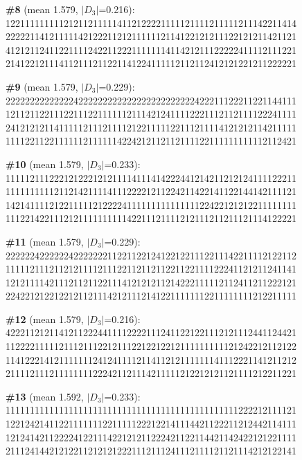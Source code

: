\documentclass[10pt]{article}
\begin{document}
\noindent\textbf{\#8} (mean 1.579, $|D_3|$=0.216):\\
122111111111212112111114112122221111121111211111211142211414\\
222221141211111421222112121111112114122121211122121211421121\\
412121124112211112422112221111111411421211122222411112111221\\
214122121114112111211221141224111112112112412121221211222221\medskip

\noindent\textbf{\#9} (mean 1.579, $|D_3|$=0.229):\\
222222222222224222222222222222222222222422211122211221144111\\
121121122111221112211111121114212411112221112112111122241111\\
241212121141111121112111121221111122111211114121212114211111\\
111122112211111121111114224212112112111122111111111112112421\medskip

\noindent\textbf{\#10} (mean 1.579, $|D_3|$=0.233):\\
111112111222121222121211114111414222441214211212124111122211\\
111111111121121421111411122221211224211422141122144142111121\\
142141111212211111212222411111111111111122422121212211111111\\
111221422111212111111111142211121111212111211211121114122221\medskip

\noindent\textbf{\#11} (mean 1.579, $|D_3|$=0.229):\\
222222422222242222222112211221241221221112211142211112122112\\
111112111211212111121112211211211221122111122241121211241141\\
121211114211121121122111412121211214222111112112411211222121\\
224221212212212112111421211121412211111112211111111212211111\medskip

\noindent\textbf{\#12} (mean 1.579, $|D_3|$=0.216):\\
422211212114121122244111122221112411221221112121112441124421\\
112222111112111211122121112212212212111111111121242212112122\\
114122214121111111241241111211411212111111141112221141211212\\
211112111211111111222421121114211111212212121121111212211221\medskip

\noindent\textbf{\#13} (mean 1.592, $|D_3|$=0.233):\\
111111111111111111111111111111111111111111111111222212111121\\
122124214112211111112211111222122141114421122211212442114111\\
121241421122224122111422121211222421122114421142422121221111\\
211124144212122112121212221112111241112111121121114212122141\medskip
\end{document}
